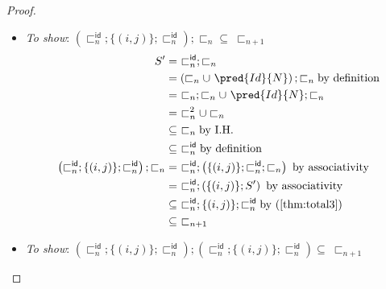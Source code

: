 {\begin{proof}
\begin{itemize}
\begin{align}
			&\subseteq\ \sqsubset_{n + 1}
		\end{align}
	\item \textit{To show}: $\left( \sqsubset_n^\mathsf{id} ; \{ (i, j) \} ; \sqsubset_n^\mathsf{id} \right) ; \sqsubset_n \subseteq\ \sqsubset_{n + 1}$
		\begin{align}
			S' &=\ \sqsubset_n^\mathsf{id} ; \sqsubset_n \\
				&= \left( \sqsubset_n \cup\ \pred{Id}{N} \right) ; \sqsubset_n \text{by definition} \\
				&=\ \sqsubset_n ; \sqsubset_n \cup\ \pred{Id}{N} ; \sqsubset_n \\
				&=\ \sqsubset_n^2 \cup \sqsubset_n \\
				&\subseteq\ \sqsubset_n \text{by I.H.} \\
				\label{thm:total3} &\subseteq\ \sqsubset_n^\mathsf{id} \text{by definition} \\
			\left( \sqsubset_n^\mathsf{id} ; \{ (i, j) \} ; \sqsubset_n^\mathsf{id} \right) ; \sqsubset_n &=\ \sqsubset_n^\mathsf{id} ; \left( \{ (i, j) \} ; \sqsubset_n^\mathsf{id} ; \sqsubset_n \right) \text{ by associativity} \\
			&=\ \sqsubset_n^\mathsf{id} ; \left( \{ (i, j) \} ; S' \right) \text{ by associativity} \\
			&\subseteq\ \sqsubset_n^\mathsf{id} ; \{ (i, j) \} ; \sqsubset_n^\mathsf{id} \text{by (\ref{thm:total3})} \\
			&\subseteq\ \sqsubset_{n + 1}
		\end{align}
	\item \textit{To show}: $\left( \sqsubset_n^\mathsf{id} ; \{ (i, j) \} ; \sqsubset_n^\mathsf{id} \right) ; \left( \sqsubset_n^\mathsf{id} ; \{ (i, j) \} ; \sqsubset_n^\mathsf{id} \right) \subseteq\ \sqsubset_{n + 1}$
	

\end{itemize}
\end{proof}}
